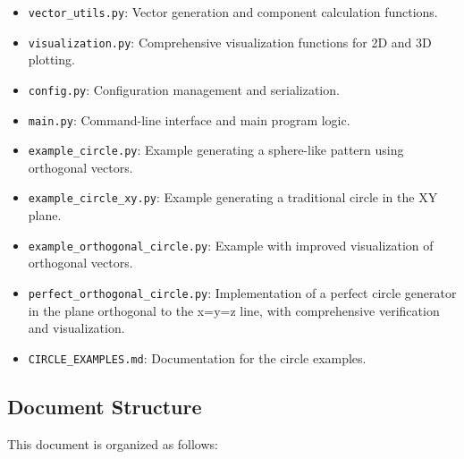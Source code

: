 \begin{itemize}
    \item \texttt{vector\_utils.py}: Vector generation and component calculation functions.
    
    \item \texttt{visualization.py}: Comprehensive visualization functions for 2D and 3D plotting.
    
    \item \texttt{config.py}: Configuration management and serialization.
    
    \item \texttt{main.py}: Command-line interface and main program logic.
    
    \item \texttt{example\_circle.py}: Example generating a sphere-like pattern using orthogonal vectors.
    
    \item \texttt{example\_circle\_xy.py}: Example generating a traditional circle in the XY plane.
    
    \item \texttt{example\_orthogonal\_circle.py}: Example with improved visualization of orthogonal vectors.
    
    \item \texttt{perfect\_orthogonal\_circle.py}: Implementation of a perfect circle generator in the plane orthogonal to the x=y=z line, with comprehensive verification and visualization.
    
    \item \texttt{CIRCLE\_EXAMPLES.md}: Documentation for the circle examples.
\end{itemize}

\subsection{Document Structure}

This document is organized as follows:

